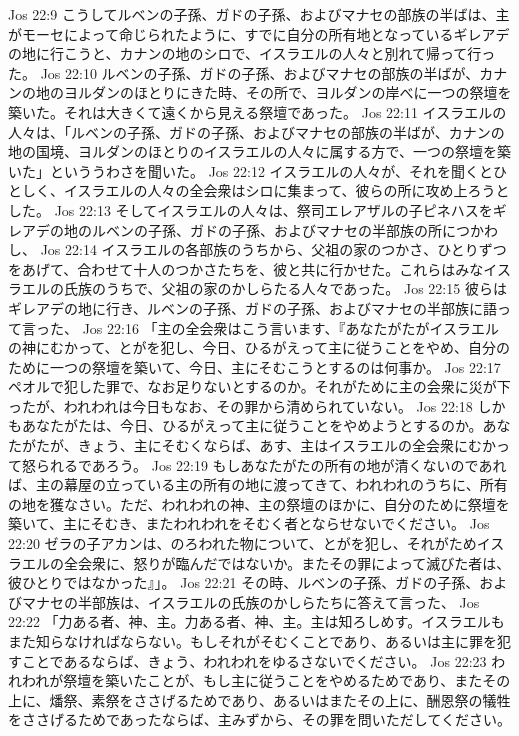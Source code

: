 Jos 22:9  こうしてルベンの子孫、ガドの子孫、およびマナセの部族の半ばは、主がモーセによって命じられたように、すでに自分の所有地となっているギレアデの地に行こうと、カナンの地のシロで、イスラエルの人々と別れて帰って行った。
Jos 22:10  ルベンの子孫、ガドの子孫、およびマナセの部族の半ばが、カナンの地のヨルダンのほとりにきた時、その所で、ヨルダンの岸べに一つの祭壇を築いた。それは大きくて遠くから見える祭壇であった。
Jos 22:11  イスラエルの人々は、「ルベンの子孫、ガドの子孫、およびマナセの部族の半ばが、カナンの地の国境、ヨルダンのほとりのイスラエルの人々に属する方で、一つの祭壇を築いた」といううわさを聞いた。
Jos 22:12  イスラエルの人々が、それを聞くとひとしく、イスラエルの人々の全会衆はシロに集まって、彼らの所に攻め上ろうとした。
Jos 22:13  そしてイスラエルの人々は、祭司エレアザルの子ピネハスをギレアデの地のルベンの子孫、ガドの子孫、およびマナセの半部族の所につかわし、
Jos 22:14  イスラエルの各部族のうちから、父祖の家のつかさ、ひとりずつをあげて、合わせて十人のつかさたちを、彼と共に行かせた。これらはみなイスラエルの氏族のうちで、父祖の家のかしらたる人々であった。
Jos 22:15  彼らはギレアデの地に行き、ルベンの子孫、ガドの子孫、およびマナセの半部族に語って言った、
Jos 22:16  「主の全会衆はこう言います、『あなたがたがイスラエルの神にむかって、とがを犯し、今日、ひるがえって主に従うことをやめ、自分のために一つの祭壇を築いて、今日、主にそむこうとするのは何事か。
Jos 22:17  ペオルで犯した罪で、なお足りないとするのか。それがために主の会衆に災が下ったが、われわれは今日もなお、その罪から清められていない。
Jos 22:18  しかもあなたがたは、今日、ひるがえって主に従うことをやめようとするのか。あなたがたが、きょう、主にそむくならば、あす、主はイスラエルの全会衆にむかって怒られるであろう。
Jos 22:19  もしあなたがたの所有の地が清くないのであれば、主の幕屋の立っている主の所有の地に渡ってきて、われわれのうちに、所有の地を獲なさい。ただ、われわれの神、主の祭壇のほかに、自分のために祭壇を築いて、主にそむき、またわれわれをそむく者とならせないでください。
Jos 22:20  ゼラの子アカンは、のろわれた物について、とがを犯し、それがためイスラエルの全会衆に、怒りが臨んだではないか。またその罪によって滅びた者は、彼ひとりではなかった』」。
Jos 22:21  その時、ルベンの子孫、ガドの子孫、およびマナセの半部族は、イスラエルの氏族のかしらたちに答えて言った、
Jos 22:22  「力ある者、神、主。力ある者、神、主。主は知ろしめす。イスラエルもまた知らなければならない。もしそれがそむくことであり、あるいは主に罪を犯すことであるならば、きょう、われわれをゆるさないでください。
Jos 22:23  われわれが祭壇を築いたことが、もし主に従うことをやめるためであり、またその上に、燔祭、素祭をささげるためであり、あるいはまたその上に、酬恩祭の犠牲をささげるためであったならば、主みずから、その罪を問いただしてください。
